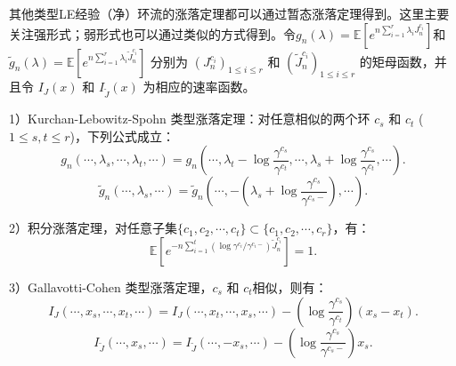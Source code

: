 其他类型LE经验（净）环流的涨落定理都可以通过暂态涨落定理得到。这里主要关注强形式；弱形式也可以通过类似的方式得到。令$g_n(\lambda) = \mathbb{E}[e^{n\sum_{i=1}^r\lambda_i J^{c_i}_n}]$和$\tilde{g}_n(\lambda) = \mathbb{E}[e^{n\sum_{i=1}^{r}\lambda_i\tilde{J}^{c_i}_n}]$ 分别为 $(J^{c_i}_n)_{1\le i\le r}$ 和 $(\tilde{J}^{c_i}_n)_{1\le i\le r}$ 的矩母函数，并且令 $I_{J}(x)$ 和 $I_{\tilde{J}}(x)$ 为相应的速率函数。

1）Kurchan-Lebowitz-Spohn 类型涨落定理：对任意相似的两个环 $c_s$ 和 $c_t$ ($1\le s,t\le r$)，下列公式成立：
\begin{equation*}
	g_n(\cdots,\lambda_s,\cdots,\lambda_t,\cdots) = g_n\left(\cdots,\lambda_t-\log\frac{\gamma^{c_s}}{\gamma^{c_t}},\cdots,\lambda_s+\log\frac{\gamma^{c_s}}{\gamma^{c_t}},\cdots\right).
\end{equation*}
\begin{equation*}
	\tilde{g}_n(\cdots,\lambda_s,\cdots)=\tilde{g}_n\left(\cdots,-\left(\lambda_s+\log\frac{\gamma^{c_s}}{\gamma^{c_s-}}\right),\cdots\right).
\end{equation*}

2）积分涨落定理，对任意子集$\{c_1,c_2,\cdots, c_t\} \subset \{c_1,c_2,\cdots, c_r\}$，有： 
\begin{equation*}
	\mathbb{E}\left[e^{-n\sum_{i=1}^t(\log \gamma^{c_i}/\gamma^{c_i-})\tilde{J}^{c_i}_n}\right]=1.
\end{equation*}

3）Gallavotti-Cohen 类型涨落定理，$c_s$ 和 $c_t$相似，则有：
\begin{equation*}
	I_J(\cdots,x_s,\cdots,x_t,\cdots)=I_J(\cdots,x_t,\cdots,x_s,\cdots)-\left(\log\frac{\gamma^{c_s}}{\gamma^{c_t}}\right)(x_s-x_t).
\end{equation*}
\begin{equation*}
	I_{\tilde{J}}(\cdots,x_s,\cdots) = I_{\tilde{J}}(\cdots,-x_s,\cdots)-\left(\log\frac{\gamma^{c_s}}{\gamma^{c_s-}}\right)x_s.
\end{equation*}

